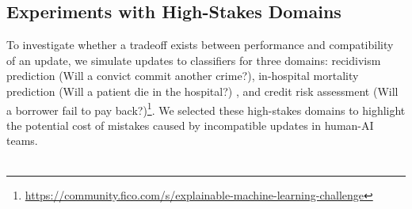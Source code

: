 \documentclass[letterpaper]{article} %
\newcommand{\bug}
    {\mbox{\rule{2mm}{2mm}}}
\newcommand{\Bug}[1]
    {\bug \footnote{BUG: {#1}}}
\newcommand{\?}{\mbox{?}}
\begin{document}



\subsection{Experiments with  High-Stakes Domains}
 To investigate whether a tradeoff exists between  performance and compatibility of an update, we simulate updates to classifiers for three domains: recidivism prediction (Will a convict commit another crime?)\cite{angwin2016machine}, in-hospital mortality prediction (Will a patient die in the hospital?) \cite{johnson2016mimic,harutyunyan2017multitask}, and credit risk assessment (Will a borrower fail to pay back?)\footnote{\url{https://community.fico.com/s/explainable-machine-learning-challenge}}. We selected these high-stakes domains to highlight the potential cost of mistakes caused by incompatible updates in human-AI teams.\\\\
\end{document}
